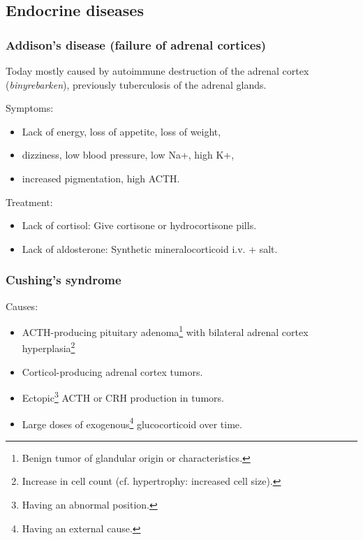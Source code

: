\subsection{Endocrine diseases}
\subsubsection{Addison's disease (failure of adrenal cortices)}
Today mostly caused by autoimmune destruction of the adrenal cortex (\emph{binyrebarken}), previously tuberculosis of the adrenal glands.

Symptoms:
\begin{itemize}
  \item Lack of energy, loss of appetite, loss of weight,
  \item dizziness, low blood pressure, low Na+, high K+,
  \item increased pigmentation, high ACTH.
\end{itemize}

Treatment:
\begin{itemize}
  \item Lack of cortisol: Give cortisone or hydrocortisone pills.
  \item Lack of aldosterone: Synthetic mineralocorticoid i.v. + salt.
\end{itemize}

\subsubsection{Cushing's syndrome}
Causes:
\begin{itemize}
  \item ACTH-producing pituitary adenoma\footnote{Benign tumor of glandular origin or characteristics.} with bilateral adrenal cortex hyperplasia\footnote{Increase in cell count (cf. hypertrophy: increased cell size).}
  \item Corticol-producing adrenal cortex tumors.
  \item Ectopic\footnote{Having an abnormal position.} ACTH or CRH production in tumors.
  \item Large doses of exogenous\footnote{Having an external cause.} glucocorticoid over time.
\end{itemize}

